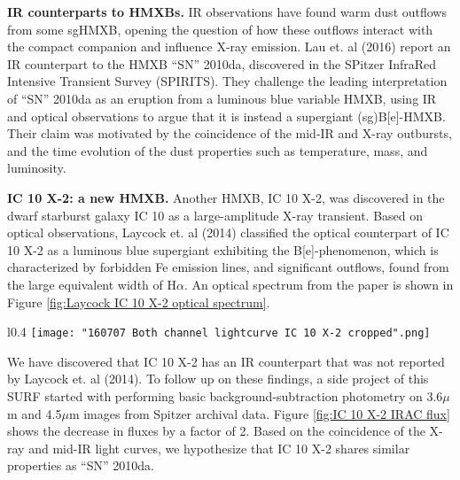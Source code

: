 \documentclass{article}
\begin{document}
\noindent\textbf{IR counterparts to HMXBs.}
IR observations have found warm dust outflows from some sgHMXB, opening the question of how these outflows interact with the compact companion and influence X-ray emission. Lau et. al (2016) report an IR counterpart to the HMXB ``SN'' 2010da, discovered in the SPitzer InfraRed Intensive Transient Survey (SPIRITS). They challenge the leading interpretation of ``SN'' 2010da as an eruption from a luminous blue variable HMXB, using IR and optical observations to argue that it is instead a supergiant (sg)B[e]-HMXB. Their claim was motivated by the coincidence of the mid-IR and X-ray outbursts, and the time evolution of the dust properties such as temperature, mass, and luminosity.

\noindent\textbf{IC 10 X-2: a new HMXB.} Another HMXB, IC 10 X-2, was discovered in the dwarf starburst galaxy IC 10 as a large-amplitude X-ray transient. Based on optical observations, Laycock et. al (2014) classified the optical counterpart of IC 10 X-2 as a luminous blue supergiant exhibiting the B[e]-phenomenon, which is characterized by forbidden Fe emission lines, and significant outflows, found from the large equivalent width of H$\alpha$. An optical spectrum from the paper is shown in Figure \ref{fig:Laycock IC 10 X-2 optical spectrum}. 
\begin{wrapfigure}[15]{l}{0.4\textwidth}
  \vspace{-3ex}
  \texttt{[image: "160707 Both channel lightcurve IC 10 X-2 cropped".png]}
  \vspace{-5ex}
  \caption{IRAC Ch 1 $3.6\mu m$ and Ch 2 $4.5 \mu m$ background-corrected flux of IC 10 X-2 (in mJy). The fluxes decreased by half shortly before the 2010 X-ray outburst (dashed line).}
  \label{fig:IC 10 X-2 IRAC flux}
\end{wrapfigure}


We have discovered that IC 10 X-2 has an IR counterpart that was not reported by Laycock et. al (2014). To follow up on these findings, a side project of this SURF started with performing basic background-subtraction photometry on 3.6$\mu$m and 4.5$\mu$m images from Spitzer archival data. Figure \ref{fig:IC 10 X-2 IRAC flux} shows the decrease in fluxes by a factor of 2. Based on the coincidence of the X-ray and mid-IR light curves, we hypothesize that IC 10 X-2 shares similar properties as ``SN'' 2010da.
\end{document}
